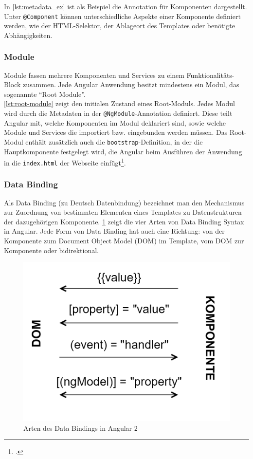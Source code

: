 In \cref{lst:metadata_ex} ist als Beispiel die Annotation für Komponenten dargestellt. Unter \texttt{@Component} können unterschiedliche Aspekte einer Komponente definiert werden, wie der \acs{HTML}-Selektor, der Ablageort des Templates oder benötigte Abhängigkeiten.

\subsubsection{Module}
Module fassen mehrere Komponenten und Services zu einem Funktionalitäts-Block zusammen. Jede Angular Anwendung besitzt mindestens ein Modul, das sogenannte \enquote{Root Module}.
\\


\cref{lst:root-module} zeigt den initialen Zustand eines Root-Moduls. Jedes Modul wird durch die Metadaten in der \texttt{@NgModule}-Annotation definiert. Diese teilt Angular mit, welche Komponenten im Modul deklariert sind, sowie welche Module und Services die importiert bzw. eingebunden werden müssen. Das Root-Modul enthält zusätzlich auch die \texttt{bootstrap}-Definition, in der die Hauptkomponente festgelegt wird, die Angular beim Ausführen der Anwendung in die \texttt{index.html} der Webseite einfügt\footcite[Vgl.][]{Angular.io2017a}.

\subsubsection{Data Binding}
Als Data Binding (zu Deutsch Datenbindung) bezeichnet man den Mechanismus zur Zuordnung von bestimmten Elementen eines Templates zu Datenstrukturen der dazugehörigen Komponente. \cref{fig:databinding} zeigt die vier Arten von Data Binding Syntax in Angular. Jede Form von Data Binding hat auch eine Richtung: von der Komponente zum Document Object Model (\acs{DOM}) im Template, vom \acs{DOM} zur Komponente oder bidirektional.

\begin{figure}[ht!]
	\centering
	\includegraphics[width=0.4\linewidth]{bilder/kap5/databinding}
	\caption[Arten des Data Bindings in Angular 2]{Arten des Data Bindings in Angular 2}
	\label{fig:databinding}
\end{figure}

